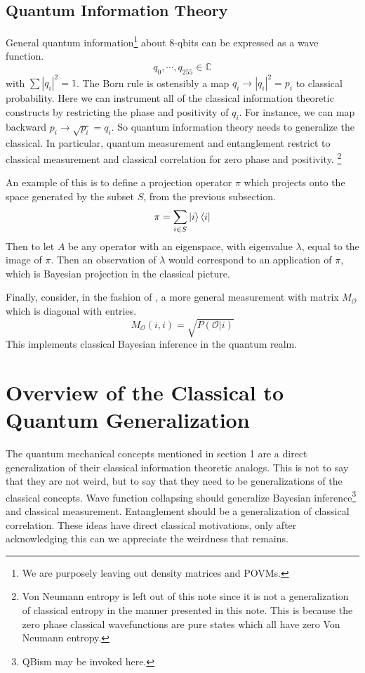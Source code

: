 \documentclass[12pt,a4paper]{article}
\begin{document}
\subsection{Quantum Information Theory}
General quantum information\footnote{We are purposely leaving out density matrices and POVMs.} about 8-qbits can be expressed as a wave function.
\[
   q_0,\cdots,q_{255} \in \mathbb{C}
\]
with $\sum |q_i|^2 = 1$.  The Born rule is ostensibly a map $q_i \rightarrow |q_i|^2 = p_i$ to classical probability.  Here we can instrument all of the classical information theoretic constructs by restricting the phase and positivity of $q_i$.  For instance, we can map backward $p_i \rightarrow \sqrt{p_i} = q_i$.  So quantum information theory needs to generalize the classical.  In particular, quantum measurement and entanglement restrict to classical measurement and classical correlation for zero phase and positivity. \footnote{Von Neumann entropy is left out of this note since it is not a generalization of classical entropy in the manner presented in this note.  This is because the zero phase classical wavefunctions are pure states which all have zero Von Neumann entropy.}

An example of this is to define a projection operator $\pi$ which projects onto the space generated by the subset $S$, from the previous subsection.
\[
\pi = \sum_{i \in S} \ket{i} \bra{i}
\]
Then to let $A$ be any operator with an eigenspace, with eigenvalue $\lambda$, equal to the image of $\pi$.  Then an observation of $\lambda$ would correspond to an application of $\pi$, which is Bayesian projection in the classical picture.

Finally, consider, in the fashion of \cite{nielsenchuang}, a more general measurement with matrix $M_\mathcal{O}$ which is diagonal with entries.
\[
   M_\mathcal{O}(i,i) = \sqrt{P(\mathcal{O} | i)}
\]
This implements classical Bayesian inference in the quantum realm.

\section{Overview of the Classical to Quantum Generalization}

The quantum mechanical concepts mentioned in section 1 are a direct generalization of their classical information theoretic analogs.  This is not to say that they are not weird, but to say that they need to be generalizations of the classical concepts.  Wave function collapsing should generalize Bayesian inference\footnote{QBism may be invoked here.} and classical measurement.  Entanglement should be a generalization of classical correlation.  These ideas have direct classical motivations, only after acknowledging this can we appreciate the weirdness that remains.
\end{document}
